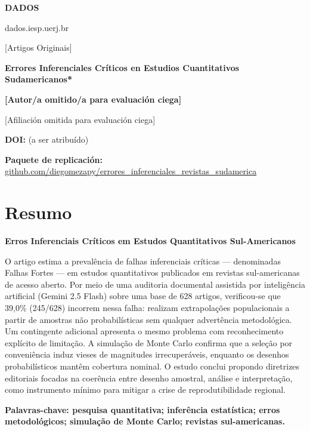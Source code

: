 \documentclass[11pt,twoside]{article}
\title{\TituloES}
\author{Diego Bernardo Meza Bogado}
\date{}
\newcommand{\ArticuloTipo}{Artigos Originais}
\newcommand{\TituloPT}{Erros Inferenciais Críticos em Estudos Quantitativos Sul-Americanos}
\newcommand{\TituloES}{Errores Inferenciales Críticos en Estudios Cuantitativos Sudamericanos}
\newcommand{\AbsBlock}[4]{%
  \section*{#1}%
  {\bfseries\large #2\par}%
  #3\par
  \vspace{4pt}%
  {\bfseries #4}%
  \vspace{8pt}%
}
\begin{document}
\thispagestyle{fancy}

{\Large\bfseries DADOS\par}
{\small dados.iesp.uerj.br\par}

\vspace{12pt}
{\small [\ArticuloTipo]\par}

\vspace{10pt}
{\LARGE\bfseries \TituloES*\par}

\vspace{10pt}
{\small \textbf{[Autor/a omitido/a para evaluación ciega]}\par}
{\footnotesize [Afiliación omitida para evaluación ciega]\par}

\vspace{6pt}
{\small \textbf{DOI:} (a ser atribuído)\par}
{\small \textbf{Paquete de replicación:} \href{https://github.com/diegomezapy/errores_inferenciales_revistas_sudamerica}{github.com/diegomezapy/errores\_inferenciales\_revistas\_sudamerica}\par}

\begingroup
\renewcommand{\thefootnote}{\fnsymbol{footnote}}
\renewcommand{\thefootnote}{\arabic{footnote}}
\endgroup

\newpage


\AbsBlock{Resumo}{\TituloPT}{%
O artigo estima a prevalência de falhas inferenciais críticas — denominadas Falhas Fortes — em estudos quantitativos publicados em revistas sul-americanas de acesso aberto. Por meio de uma auditoria documental assistida por inteligência artificial (Gemini 2.5 Flash) sobre uma base de 628 artigos, verificou-se que 39,0\% (245/628) incorrem nessa falha: realizam extrapolações populacionais a partir de amostras não probabilísticas sem qualquer advertência metodológica. Um contingente adicional apresenta o mesmo problema com reconhecimento explícito de limitação. A simulação de Monte Carlo confirma que a seleção por conveniência induz vieses de magnitudes irrecuperáveis, enquanto os desenhos probabilísticos mantêm cobertura nominal. O estudo conclui propondo diretrizes editoriais focadas na coerência entre desenho amostral, análise e interpretação, como instrumento mínimo para mitigar a crise de reprodutibilidade regional.%
}{\textbf{Palavras-chave:} pesquisa quantitativa; inferência estatística; erros metodológicos; simulação de Monte Carlo; revistas sul-americanas.}
\end{document}
